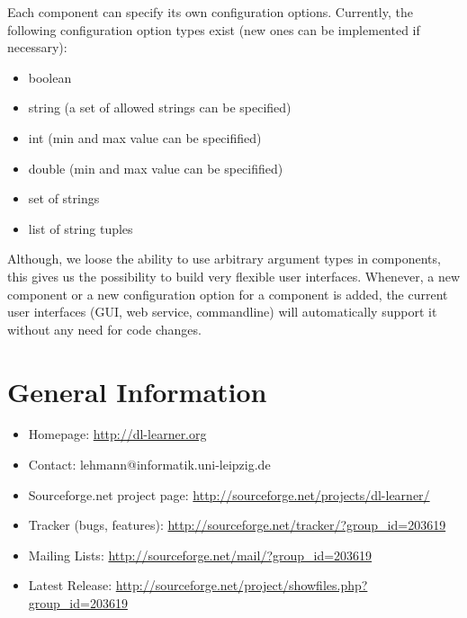 \documentclass[a4paper,12pt]{scrartcl}
\begin{document}
Each component can specify its own configuration options. Currently, the following configuration option types exist (new ones can be implemented if necessary):

\begin{itemize}
 \item boolean
 \item string (a set of allowed strings can be specified)
 \item int (min and max value can be specifified)
 \item double (min and max value can be specifified)
 \item set of strings
 \item list of string tuples
\end{itemize}

Although, we loose the ability to use arbitrary argument types in components, this gives us the possibility to build very flexible user interfaces. Whenever, a new component or a new configuration option for a component is added, the current user interfaces (GUI, web service, commandline) will automatically support it without any need for code changes.

\section{General Information}
\label{sec:general}
\label{sec:contact}

\begin{itemize}
 \item Homepage: \url{http://dl-learner.org}
 \item Contact: lehmann@informatik.uni-leipzig.de
 \item Sourceforge.net project page: \url{http://sourceforge.net/projects/dl-learner/}
 \item Tracker (bugs, features): \url{http://sourceforge.net/tracker/?group_id=203619}
 \item Mailing Lists: \url{http://sourceforge.net/mail/?group_id=203619}
 \item Latest Release: \url{http://sourceforge.net/project/showfiles.php?group_id=203619}
\end{itemize}



\end{document}
